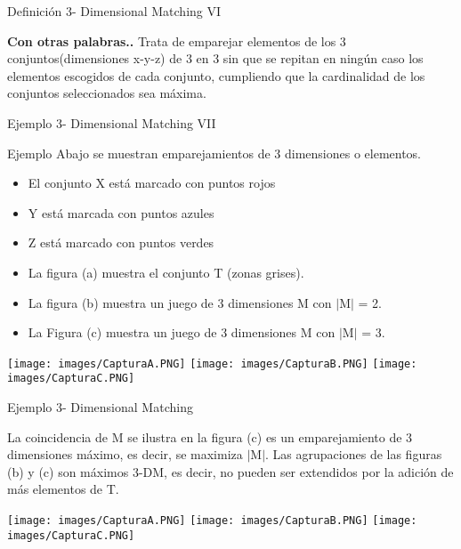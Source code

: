 \documentclass[10pt, mathserif, profesionalfont]{beamer}
\begin{document}
	
	\begin{frame}{Definición 3- Dimensional Matching VI}
		\begin{block}{\textbf{Con otras palabras..}}
			Trata de emparejar elementos de los 3 conjuntos(dimensiones x-y-z) de 3 en 3 sin que se repitan en ningún caso los elementos escogidos de cada conjunto, cumpliendo que la cardinalidad de los conjuntos seleccionados sea máxima.
		\end{block}
	\end{frame}
	
	
	\begin{frame}{Ejemplo 3- Dimensional Matching VII}
		\begin{block}{Ejemplo}
			Abajo se muestran emparejamientos de 3 dimensiones o elementos. 
			\begin{itemize}
				\item El conjunto X está marcado con puntos rojos
				\item Y está marcada con puntos azules
				\item Z está marcado con puntos verdes
			\end{itemize}
		\end{block}
		
		\begin{block}{}	
			\begin{itemize}
				\item La figura (a) muestra el conjunto T (zonas grises). 
				\item La figura (b) muestra un juego de 3 dimensiones M con $\mid$M$\mid$ = 2.
				\item La Figura (c) muestra un juego de 3 dimensiones M con $\mid$M$\mid$ = 3.
			\end{itemize}
		\end{block}
		
		\begin{center}
			\texttt{[image: images/CapturaA.PNG]}
			\texttt{[image: images/CapturaB.PNG]}
			\texttt{[image: images/CapturaC.PNG]}
		\end{center}
		
	\end{frame}
	
	
	\begin{frame}{Ejemplo 3- Dimensional Matching}
		\begin{block}{}
			La coincidencia de M se ilustra en la figura (c) es un emparejamiento de 3 dimensiones máximo, es decir, se maximiza $\mid$M$\mid$. Las agrupaciones de las figuras (b) y (c) son máximos 3-DM, es decir, no pueden ser extendidos por la adición de más elementos de T.
		\end{block}
		
		\begin{center}
			\texttt{[image: images/CapturaA.PNG]}
			\texttt{[image: images/CapturaB.PNG]}
			\texttt{[image: images/CapturaC.PNG]}
		\end{center}
	\end{frame}
	
\end{document}
